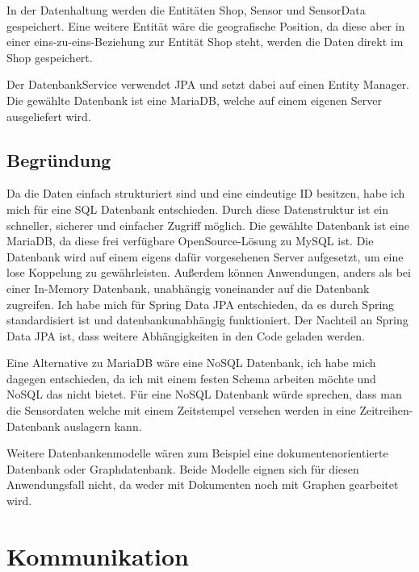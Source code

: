 \documentclass[runningheads]{llncs}
\begin{document}
In der Datenhaltung werden die Entitäten Shop, Sensor und SensorData gespeichert.
Eine weitere Entität wäre die geografische Position, da diese aber in einer eins-zu-eins-Beziehung zur Entität Shop steht, werden die Daten direkt im Shop gespeichert.

Der DatenbankService verwendet JPA und setzt dabei auf einen Entity Manager.
Die gewählte Datenbank ist eine MariaDB, welche auf einem eigenen Server ausgeliefert wird.


\subsection{Begründung}
Da die Daten einfach strukturiert sind und eine eindeutige ID besitzen, habe ich mich für eine SQL Datenbank entschieden.
Durch diese Datenstruktur ist ein schneller, sicherer und einfacher Zugriff möglich.
Die gewählte Datenbank ist eine MariaDB, da diese frei verfügbare OpenSource-Lösung zu MySQL ist.
Die Datenbank wird auf einem eigens dafür vorgesehenen Server aufgesetzt, um eine lose Koppelung zu gewährleisten. Außerdem können Anwendungen, anders als bei einer In-Memory Datenbank, unabhängig voneinander auf die Datenbank zugreifen.
Ich habe mich für Spring Data JPA entschieden, da es durch Spring standardisiert ist und datenbankunabhängig funktioniert. Der Nachteil an Spring Data JPA ist, dass weitere Abhängigkeiten in den Code geladen werden.

Eine Alternative zu MariaDB wäre eine NoSQL Datenbank, ich habe mich dagegen entschieden, da ich mit einem festen Schema arbeiten möchte und NoSQL das nicht bietet.
Für eine NoSQL Datenbank würde sprechen, dass man die Sensordaten welche mit einem Zeitstempel versehen werden in eine Zeitreihen-Datenbank auslagern kann.

Weitere Datenbankenmodelle wären zum Beispiel eine dokumentenorientierte Datenbank oder Graphdatenbank. Beide Modelle eignen sich für diesen Anwendungsfall nicht, da weder mit Dokumenten noch mit Graphen gearbeitet wird.
\newpage

\section{Kommunikation}
\end{document}
